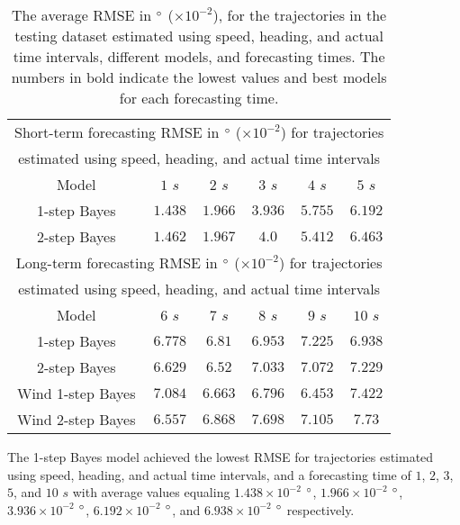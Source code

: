 \documentclass[preprint,12pt]{elsarticle}
\begin{document}
\begin{table}[!ht]
	\centering
	\begin{tabular}{|c|c|c|c|c|c|}
		\hline
		\multicolumn{6}{|c|}{Short-term forecasting RMSE in $\degree$ ($\times 10^{-2}$) for trajectories} \\ 
		\multicolumn{6}{|c|}{estimated using speed, heading, and actual time intervals} \\ \hline
		Model & $1$ $s$ & $2$ $s$ & $3$ $s$ & $4$ $s$ & $5$ $s$ \\ \hline
		1-step Bayes & $\mathbf{1.438}$ & $\mathbf{1.966}$ & $\mathbf{3.936}$ & $5.755$ & $\mathbf{6.192}$ \\ \hline
		2-step Bayes & $1.462$ & $1.967$ & $4.0$ & $\mathbf{5.412}$ & $6.463$ \\ \hline
		\multicolumn{6}{|c|}{Long-term forecasting RMSE in $\degree$ ($\times 10^{-2}$) for trajectories} \\ 
		\multicolumn{6}{|c|}{estimated using speed, heading, and actual time intervals} \\ \hline
		Model & $6$ $s$ & $7$ $s$ & $8$ $s$ & $9$ $s$ & $10$ $s$ \\ \hline
		1-step Bayes & $6.778$ & $6.81$ & $6.953$ & $7.225$ & $\mathbf{6.938}$ \\ \hline
		2-step Bayes & $6.629$ & $\mathbf{6.52}$ & $7.033$ & $7.072$ & $7.229$ \\ \hline
		Wind 1-step Bayes & $7.084$ & $6.663$ & $\mathbf{6.796}$ & $\mathbf{6.453}$ & $7.422$ \\ \hline
		Wind 2-step Bayes & $\mathbf{6.557}$ & $6.868$ & $7.698$ & $7.105$ & $7.73$ \\ \hline
	\end{tabular}
	\caption{The average RMSE in $\degree$ ($\times 10^{-2}$), for the trajectories in the testing dataset estimated using speed, heading, and actual time intervals, different models, and forecasting times. The numbers in bold indicate the lowest values and best models for each forecasting time.}
	\label{tab:best_speed_actual_dir_RMSE}
\end{table}

The 1-step Bayes model achieved the lowest RMSE for trajectories estimated using speed, heading, and actual time intervals, and a forecasting time of $1$, $2$, $3$, $5$, and $10$ $s$ with average values equaling $1.438 \times 10^{-2}$ $\degree$, $1.966 \times 10^{-2}$ $\degree$, $3.936 \times 10^{-2}$ $\degree$, $6.192 \times 10^{-2}$ $\degree$, and $6.938 \times 10^{-2}$ $\degree$ respectively.
\end{document}
